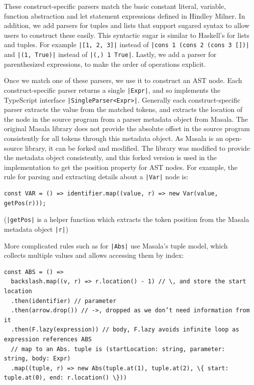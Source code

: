 \documentclass[a4paper,fleqn,oneside,12pt]{report}
\begin{document}
These construct-specific parsers match the basic constant literal, variable, function abstraction and let statement expressions defined in Hindley Milner. In addition, we add parsers for tuples and lists that support sugared syntax to allow users to construct these easily. This syntactic sugar is similar to Haskell’s for lists and tuples. For example \texttt{|[1, 2, 3]|} instead of  \texttt{|cons 1 (cons 2 (cons 3 [])|} and \texttt{|(1, True)|} instead of \texttt{|(,) 1 True|}. Lastly, we add a parser for parenthesized expressions, to make the order of operations explicit.

Once we match one of these parsers, we use it to construct an AST node. Each construct-specific parser returns a single \texttt{|Expr|}, and so implements the TypeScript interface \texttt{|SingleParser<Expr>|}. Generally each construct-specific parser extracts the value from the matched tokens, and extracts the location of the node in the source program from a parser metadata object from Masala. The original Masala library does not provide the absolute offset in the source program consistently for all tokens through this metadata object. As Masala is an open-source library, it can be forked and modified. The library was modified to provide the metadata object consistently, and this forked version is used in the implementation to get the position property for AST nodes. For example, the rule for parsing and extracting details about a \texttt{|Var|} node is:

\begin{verbatim}
const VAR = () => identifier.map((value, r) => new Var(value, getPos(r)));
\end{verbatim}

(\texttt{|getPos|} is a helper function which extracts the token position from the Masala metadata object \texttt{|r|})

More complicated rules such as for \texttt{|Abs|} use Masala’s tuple model, which collects multiple values and allows accessing them by index:

\begin{verbatim}
const ABS = () =>
  backslash.map((v, r) => r.location() - 1) // \, and store the start location
  .then(identifier) // parameter
  .then(arrow.drop()) // ->, dropped as we don’t need information from it
  .then(F.lazy(expression)) // body, F.lazy avoids infinite loop as expression references ABS
  // map to an Abs. tuple is (startLocation: string, parameter: string, body: Expr)
  .map((tuple, r) => new Abs(tuple.at(1), tuple.at(2), \{ start: tuple.at(0), end: r.location() \}))
\end{verbatim}
\end{document}
